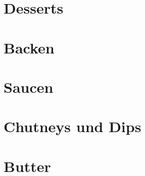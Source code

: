 \documentclass[DIV=11, pagesize, fontsize=11pt, paper=a4, numbers=noenddot]{scrartcl}
\begin{document}
\section{Desserts}
\newpage{}
\newpage{}
\newpage{}
\newpage{}
\newpage{}
\newpage{}

\section{Backen}
\newpage{}
\newpage{}
\newpage{}
\newpage{}

\section{Saucen}
\newpage{}
\newpage{}
\newpage{}
\newpage{}
\newpage{}
\newpage{}
\newpage{}
\newpage{}
\newpage{}
\newpage{}

\section{Chutneys und Dips}
\newpage{}
\newpage{}
\newpage{}
\newpage{}

\section{Butter}
\newpage{}
\newpage{}
\newpage{}
\newpage{}
\newpage{}
\end{document}
